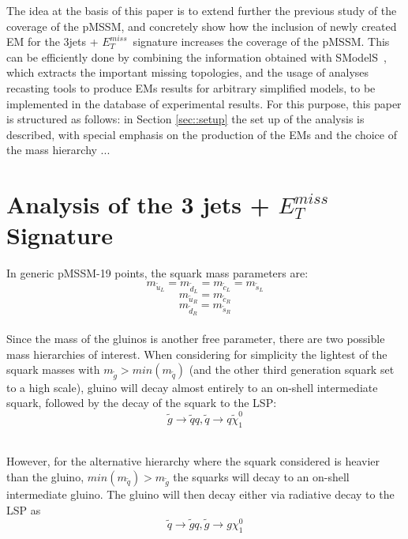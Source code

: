 \documentclass[a4paper,11pt]{article}
\newcommand{\SMO}{{\sc SModelS}}
\newcommand{\MET}{{ $E_T ^{miss}$}}
\begin{document}
The idea at the basis of this paper is to extend further the previous study of the coverage of the pMSSM, and concretely show how the inclusion of newly created EM for the 3jets + \MET~signature increases the coverage of the pMSSM. This can be efficiently done by combining the information obtained with \SMO~, which extracts the important missing topologies, and the usage of analyses recasting tools to produce EMs results for arbitrary simplified models, to be implemented in the database of experimental results. For this purpose, this paper is structured as follows: in Section \ref{sec::setup} the set up of the analysis is described, with special emphasis on the production of the EMs and the choice of the mass hierarchy ... 

\section{Analysis of the 3 jets + $E_T ^{miss}$ Signature }\label{sec::T3GQ}
In generic pMSSM-19 points, the squark mass parameters are: 
\begin{equation*}
m_{\tilde u_L} = m_{\tilde d_L} = m_{\tilde c_L} = m_{\tilde s_L} 
\end{equation*}
\begin{equation*}
m_{\tilde u_R} = m_{\tilde c_R} 
\end{equation*}
\begin{equation*}
m_{\tilde d_R} = m_{\tilde s_R}
\end{equation*}
\\
Since the mass of the gluinos is another free parameter, there are two possible mass hierarchies of interest. 
When considering for simplicity the lightest of the squark masses with $m_{\tilde g} > min(m_{\tilde q})$ (and the other third generation squark set to a high scale), gluino will decay almost entirely to an on-shell intermediate squark, followed by the decay of the squark to the LSP:
\begin{equation}\label{decay_TGQ}
\tilde g \rightarrow \tilde q q , \tilde q \rightarrow q \tilde \chi_1 ^0
\end{equation}

\\
However, for the alternative hierarchy where the squark considered is heavier than the gluino,  $ min(m_{\tilde q}) > m_{\tilde g}$ the squarks will decay to an on-shell intermediate gluino. The gluino will then decay either via radiative decay to the LSP as 
\begin{equation}\label{decay_TQG}
\tilde q \rightarrow \tilde g q , \tilde g \rightarrow g \chi_1 ^0
\end{equation} 
\end{document}
